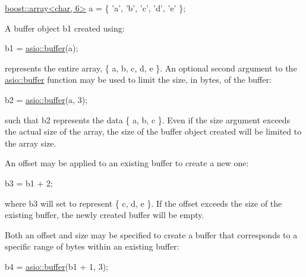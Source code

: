 \begin{DoxyCode}
\hyperlink{classboost_1_1array}{boost::array<char, 6>} a = \{ \textcolor{charliteral}{'a'}, \textcolor{charliteral}{'b'}, \textcolor{charliteral}{'c'}, \textcolor{charliteral}{'d'}, \textcolor{charliteral}{'e'} \}; 
\end{DoxyCode}


A buffer object {\ttfamily b1} created using\+:


\begin{DoxyCode}
b1 = \hyperlink{group__buffer_ga1ed66e401559cbfd19595392f653b47c}{asio::buffer}(a); 
\end{DoxyCode}


represents the entire array, {\ttfamily \{ \textquotesingle{}a\textquotesingle{}, \textquotesingle{}b\textquotesingle{}, \textquotesingle{}c\textquotesingle{}, \textquotesingle{}d\textquotesingle{}, \textquotesingle{}e\textquotesingle{} \}}. An optional second argument to the \hyperlink{group__buffer_ga1ed66e401559cbfd19595392f653b47c}{asio\+::buffer} function may be used to limit the size, in bytes, of the buffer\+:


\begin{DoxyCode}
b2 = \hyperlink{group__buffer_ga1ed66e401559cbfd19595392f653b47c}{asio::buffer}(a, 3); 
\end{DoxyCode}


such that {\ttfamily b2} represents the data {\ttfamily \{ \textquotesingle{}a\textquotesingle{}, \textquotesingle{}b\textquotesingle{}, \textquotesingle{}c\textquotesingle{} \}}. Even if the size argument exceeds the actual size of the array, the size of the buffer object created will be limited to the array size.

An offset may be applied to an existing buffer to create a new one\+:


\begin{DoxyCode}
b3 = b1 + 2; 
\end{DoxyCode}


where {\ttfamily b3} will set to represent {\ttfamily \{ \textquotesingle{}c\textquotesingle{}, \textquotesingle{}d\textquotesingle{}, \textquotesingle{}e\textquotesingle{} \}}. If the offset exceeds the size of the existing buffer, the newly created buffer will be empty.

Both an offset and size may be specified to create a buffer that corresponds to a specific range of bytes within an existing buffer\+:


\begin{DoxyCode}
b4 = \hyperlink{group__buffer_ga1ed66e401559cbfd19595392f653b47c}{asio::buffer}(b1 + 1, 3); 
\end{DoxyCode}


